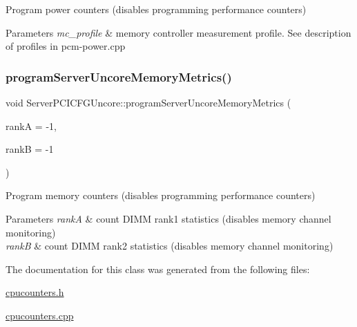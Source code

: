 Program power counters (disables programming performance counters) 


\begin{DoxyParams}{Parameters}
{\em mc\+\_\+profile} & memory controller measurement profile. See description of profiles in pcm-\/power.\+cpp \\
\hline
\end{DoxyParams}
\mbox{\label{class_server_p_c_i_c_f_g_uncore_a55caf03764268f7696fb8a2c8f3cc8f4}} 
\subsubsection{\texorpdfstring{program\+Server\+Uncore\+Memory\+Metrics()}{programServerUncoreMemoryMetrics()}}
{\footnotesize\ttfamily void Server\+P\+C\+I\+C\+F\+G\+Uncore\+::program\+Server\+Uncore\+Memory\+Metrics (\begin{DoxyParamCaption}\item[{int}]{rankA = {\ttfamily -\/1},  }\item[{int}]{rankB = {\ttfamily -\/1} }\end{DoxyParamCaption})}



Program memory counters (disables programming performance counters) 


\begin{DoxyParams}{Parameters}
{\em rankA} & count D\+I\+MM rank1 statistics (disables memory channel monitoring) \\
\hline
{\em rankB} & count D\+I\+MM rank2 statistics (disables memory channel monitoring) \\
\hline
\end{DoxyParams}


The documentation for this class was generated from the following files\+:\begin{DoxyCompactItemize}
\item 
\mbox{\hyperlink{cpucounters_8h}{cpucounters.\+h}}\item 
\mbox{\hyperlink{cpucounters_8cpp}{cpucounters.\+cpp}}\end{DoxyCompactItemize}
